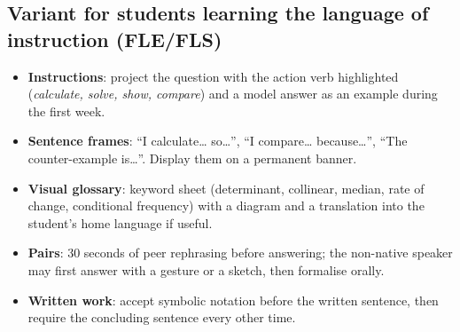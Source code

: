 \subsection*{Variant for students learning the language of instruction (FLE/FLS)}
\begin{itemize}[leftmargin=1.2em,itemsep=2pt]
  \item \textbf{Instructions}: project the question with the action verb highlighted (\emph{calculate, solve, show, compare}) and a model answer as an example during the first week.
  \item \textbf{Sentence frames}: ``I calculate\ldots{} so\ldots{}'', ``I compare\ldots{} because\ldots{}'', ``The counter-example is\ldots{}''. Display them on a permanent banner.
  \item \textbf{Visual glossary}: keyword sheet (determinant, collinear, median, rate of change, conditional frequency) with a diagram and a translation into the student's home language if useful.
  \item \textbf{Pairs}: 30 seconds of peer rephrasing before answering; the non-native speaker may first answer with a gesture or a sketch, then formalise orally.
  \item \textbf{Written work}: accept symbolic notation before the written sentence, then require the concluding sentence every other time.
\end{itemize}

